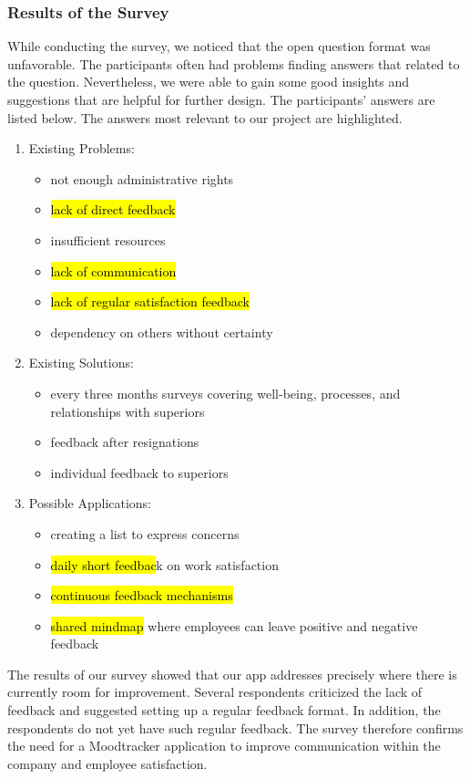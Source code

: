 \documentclass[11pt]{article}
\begin{document}
\subsubsection{Results of the Survey}
While conducting the survey, we noticed that the open question format was unfavorable. The participants often had problems finding answers that related to the question. Nevertheless, we were able to gain some good insights and suggestions that are helpful for further design. The participants' answers are listed below. The answers most relevant to our project are highlighted.\\
\begin{enumerate}
  \item Existing Problems:
    \begin{itemize}
    \item not enough administrative rights
    \item \hl{lack of direct feedback}
    \item insufficient resources
    \item \hl{lack of communication}
    \item \hl{lack of regular satisfaction feedback}
    \item dependency on others without certainty
    \end{itemize}
    
  \item Existing Solutions:
    \begin{itemize}
    \item every three months surveys covering well-being,                      processes, and relationships with superiors
    \item feedback after resignations
    \item individual feedback to superiors
    \end{itemize}
    
  \item Possible Applications:
        \begin{itemize}
        \item creating a list to express concerns
        \item \hl{daily short feedbac}k on work satisfaction
        \item \hl{continuous feedback mechanisms}
        \item \hl{shared mindmap} where employees can leave positive and             negative feedback
        \end{itemize}
        
\end{enumerate}
The results of our survey showed that our app addresses precisely where there is currently room for improvement. Several respondents criticized the lack of feedback and suggested setting up a regular feedback format. In addition, the respondents do not yet have such regular feedback. The survey therefore confirms the need for a Moodtracker application to improve communication within the company and employee satisfaction.
\end{document}
